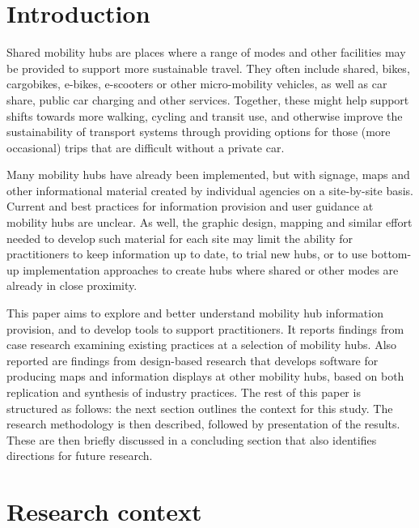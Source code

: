 \documentclass[preprint, 3p,
authoryear]{elsarticle} %
\begin{document}
\section{Introduction}\label{introduction}

Shared mobility hubs are places where a range of modes and other
facilities may be provided to support more sustainable travel. They
often include shared, bikes, cargobikes, e-bikes, e-scooters or other
micro-mobility vehicles, as well as car share, public car charging and
other services. Together, these might help support shifts towards more
walking, cycling and transit use, and otherwise improve the
sustainability of transport systems through providing options for those
(more occasional) trips that are difficult without a private car.

Many mobility hubs have already been implemented, but with signage, maps
and other informational material created by individual agencies on a
site-by-site basis. Current and best practices for information provision
and user guidance at mobility hubs are unclear. As well, the graphic
design, mapping and similar effort needed to develop such material for
each site may limit the ability for practitioners to keep information up
to date, to trial new hubs, or to use bottom-up implementation
approaches to create hubs where shared or other modes are already in
close proximity.

This paper aims to explore and better understand mobility hub
information provision, and to develop tools to support practitioners. It
reports findings from case research examining existing practices at a
selection of mobility hubs. Also reported are findings from design-based
research that develops software for producing maps and information
displays at other mobility hubs, based on both replication and synthesis
of industry practices. The rest of this paper is structured as follows:
the next section outlines the context for this study. The research
methodology is then described, followed by presentation of the results.
These are then briefly discussed in a concluding section that also
identifies directions for future research.

\section{Research context}\label{research-context}
\end{document}
